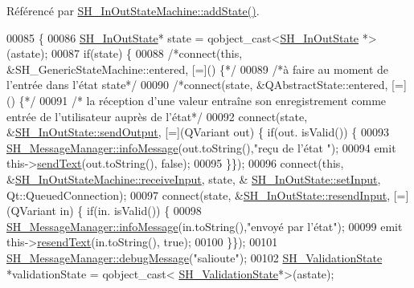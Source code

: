 Référencé par \hyperlink{classSH__InOutStateMachine_a52469f4988c3eb654def2ed237fd10eb}{S\-H\-\_\-\-In\-Out\-State\-Machine\-::add\-State()}.


\begin{DoxyCode}
00085 \{
00086     \hyperlink{classSH__InOutState}{SH\_InOutState}* state = qobject\_cast<\hyperlink{classSH__InOutState}{SH\_InOutState} *>(astate);
00087     \textcolor{keywordflow}{if}(state) \{
00088         \textcolor{comment}{/*connect(this, &SH\_GenericStateMachine::entered, [=]() \{*/}
00089         \textcolor{comment}{/*à faire au moment de l'entrée dans l'état state*/}
00090         \textcolor{comment}{/*connect(state, &QAbstractState::entered, [=]() \{*/}
00091         \textcolor{comment}{/* la réception d'une valeur entraîne son enregistrement comme entrée de l'utilisateur auprès de
       l'état*/}
00092         connect(state, &\hyperlink{classSH__InOutState_a77921c5f42059bc97361f4ff7827da12}{SH\_InOutState::sendOutput}, [=](QVariant out) \{ \textcolor{keywordflow}{if}(out.
      isValid()) \{
00093                 \hyperlink{classSH__MessageManager_a0b35c2f96e6d69934bf7f7c1e2172ea9}{SH\_MessageManager::infoMessage}(out.toString(),\textcolor{stringliteral}{"reçu de l'état
      "});
00094                 emit this->\hyperlink{classSH__InOutStateMachine_a5e7f5958bae31696b6a8deab94ad2b4f}{sendText}(out.toString(), \textcolor{keyword}{false});
00095             \}\});
00096         connect(\textcolor{keyword}{this}, &\hyperlink{classSH__InOutStateMachine_a037ed5e13ecfae2123a8d4940292e410}{SH\_InOutStateMachine::receiveInput}, state, &
      \hyperlink{classSH__InOutState_aaec9c2b5ef7c406bff7469461352d47c}{SH\_InOutState::setInput}, Qt::QueuedConnection);
00097         connect(state, &\hyperlink{classSH__InOutState_a1f00480afefd173002cf56d4c4128048}{SH\_InOutState::resendInput}, [=](QVariant in) \{  \textcolor{keywordflow}{if}(in.
      isValid()) \{
00098                 \hyperlink{classSH__MessageManager_a0b35c2f96e6d69934bf7f7c1e2172ea9}{SH\_MessageManager::infoMessage}(in.toString(),\textcolor{stringliteral}{"envoyé par
       l'état"});
00099                 emit this->\hyperlink{classSH__InOutStateMachine_a526822c66b46aa0cd81ba4473fa5573f}{resendText}(in.toString(), \textcolor{keyword}{true});
00100             \}\});
00101         \hyperlink{classSH__MessageManager_a379f2aa0a590a5add34dbe91f98b2ff7}{SH\_MessageManager::debugMessage}(\textcolor{stringliteral}{"salioute"});
00102         \hyperlink{classSH__ValidationState}{SH\_ValidationState} *validationState = qobject\_cast<
      \hyperlink{classSH__ValidationState}{SH\_ValidationState}*>(astate);

\end{DoxyCode}
